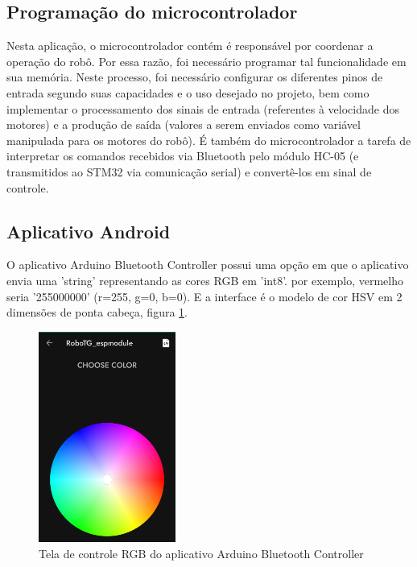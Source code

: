 \subsection{Programação do microcontrolador}
Nesta aplicação, o microcontrolador contém é responsável por coordenar a operação do robô. Por essa razão, foi
necessário programar tal funcionalidade em sua memória. Neste processo, foi necessário configurar os diferentes pinos de
entrada segundo suas capacidades e o uso desejado no projeto, bem como implementar o processamento dos sinais de entrada
(referentes à velocidade dos motores) e a produção de saída (valores a serem enviados como variável manipulada para os
motores do robô). É também do microcontrolador a tarefa de interpretar os comandos recebidos via Bluetooth pelo módulo 
HC-05 (e transmitidos ao STM32 via comunicação serial) e convertê-los em sinal de controle.

\subsection{Aplicativo Android}

O aplicativo Arduino Bluetooth Controller possui uma opção em que o aplicativo envia uma 'string' representando as cores RGB em 'int8'.
por exemplo,  vermelho seria '255000000' (r=255, g=0, b=0). E a interface é o modelo de cor HSV em 2 dimensões de ponta cabeça,
figura \ref{arduino_bluetooth_controller_hsl_model}.


\begin{figure}[htb]
	\centering
	\includegraphics[width=0.40\textwidth]{figures/andriod_bluetooth_controller_hsl_model}
	\caption{Tela de controle RGB do aplicativo Arduino Bluetooth Controller}
	\label{arduino_bluetooth_controller_hsl_model}
\end{figure}

